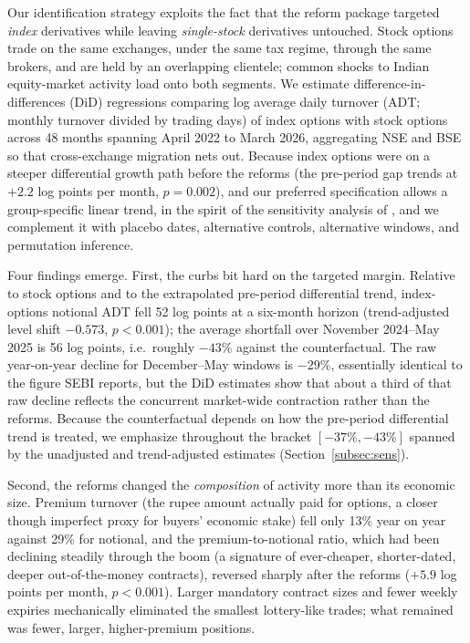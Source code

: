 \documentclass[12pt]{article}
\begin{document}
Our identification strategy exploits the fact that the reform package
targeted \emph{index} derivatives while leaving \emph{single-stock}
derivatives untouched. Stock options trade on the same exchanges, under the
same tax regime, through the same brokers, and are held by an overlapping
clientele; common shocks to Indian equity-market activity load onto both
segments. We estimate difference-in-differences (DiD) regressions comparing
log average daily turnover (ADT; monthly turnover divided by trading days)
of index options with stock options across
48 months spanning April 2022 to March 2026, aggregating NSE and BSE so that
cross-exchange migration nets out. Because index options were on a steeper
differential growth path before the reforms (the pre-period gap trends at
$+2.2$ log points per month, $p=0.002$), and our preferred specification allows
a group-specific linear trend, in the spirit of the sensitivity analysis of
\citet{rambachanroth2023}, and we complement it with placebo dates,
alternative controls, alternative windows, and permutation inference.

Four findings emerge. First, the curbs bit hard on the targeted margin.
Relative to stock options and to the extrapolated pre-period differential
trend, index-options notional ADT fell 52 log points at a six-month horizon
(trend-adjusted level shift $-0.573$, $p<0.001$); the average shortfall over
November 2024--May 2025 is 56 log points, i.e.\ roughly $-43\%$ against the
counterfactual. The raw year-on-year decline for December--May windows is
$-29\%$, essentially identical to the figure SEBI reports, but the DiD
estimates show that about a third of that raw decline reflects the concurrent
market-wide contraction rather than the reforms. Because the counterfactual
depends on how the pre-period differential trend is treated, we emphasize
throughout the bracket $[-37\%, -43\%]$ spanned by the unadjusted and
trend-adjusted estimates (Section~\ref{subsec:sens}).

Second, the reforms changed the \emph{composition} of activity more than its
economic size. Premium turnover (the rupee amount actually paid for options, a closer
though imperfect proxy for buyers' economic stake) fell only 13\% year on year against 29\% for notional, and the
premium-to-notional ratio, which had been declining steadily through the boom
(a signature of ever-cheaper, shorter-dated, deeper out-of-the-money
contracts), reversed sharply after the reforms ($+5.9$ log points per month,
$p<0.001$). Larger mandatory contract sizes and fewer weekly expiries
mechanically eliminated the smallest lottery-like trades; what remained was
fewer, larger, higher-premium positions.
\end{document}

